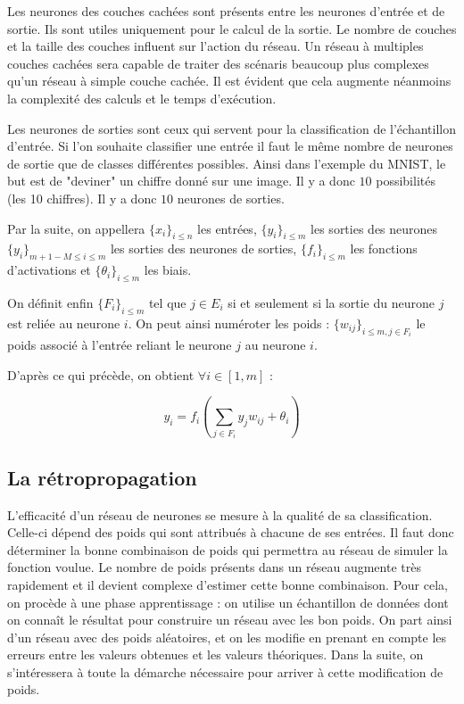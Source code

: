 \medskip

Les neurones des couches cachées sont présents entre les neurones d'entrée et
de sortie. Ils sont utiles uniquement pour le calcul de la sortie. Le nombre de
couches et la taille des couches influent sur l'action du réseau. Un réseau à
multiples couches cachées sera capable de traiter des scénaris beaucoup plus
complexes qu'un réseau à simple couche cachée. Il est évident que cela augmente
néanmoins la complexité des calculs et le temps d'exécution.

\medskip

Les neurones de sorties sont ceux qui servent pour la classification de
l'échantillon d'entrée. Si l'on souhaite classifier une entrée il faut le même
nombre de neurones de sortie que de classes différentes possibles. Ainsi dans
l'exemple du MNIST, le but est de "deviner" un chiffre donné sur une image. Il
y a donc $10$ possibilités (les 10 chiffres). Il y a donc $10$ neurones de
sorties.

\medskip

Par la suite, on appellera $\{x_i\}_{i \leq n}$ les entrées,
$\{y_i\}_{i \leq m}$ les sorties des neurones $\{y_i\}_{m+1-M \leq i \leq m}$
les sorties des neurones de sorties, $\{f_i\}_{i \leq m}$ les fonctions
d'activations et $\{\theta_i\}_{i \leq m}$ les biais.

\medskip

On définit enfin $\{F_i\}_{i \leq m}$ tel que $j \in E_i$ si et seulement si la
sortie du neurone $j$ est reliée au neurone $i$. On peut ainsi numéroter les
poids : $\{w_{ij}\}_{i \leq m, j \in F_i} $ le poids associé à l'entrée reliant
le neurone $j$ au neurone $i$.

\medskip

D'après ce qui précède, on obtient $\forall i \in [1, m]$ :

\[y_i = f_i(\sum_{j \in F_i} y_jw_{ij} + \theta_i) \]

\subsection{La rétropropagation}

L'efficacité d'un réseau de neurones se mesure à la qualité de sa classification.
Celle-ci dépend des poids qui sont attribués à chacune de ses entrées. Il faut
donc déterminer la bonne combinaison de poids qui permettra au réseau de simuler
la fonction voulue. Le nombre de poids présents dans un réseau augmente très
rapidement et il devient complexe d'estimer cette bonne combinaison. Pour cela,
on procède à une phase apprentissage : on utilise un échantillon de données
dont on connaît le résultat pour construire un réseau avec les bon poids. On
part ainsi d'un réseau avec des poids aléatoires, et on les modifie en prenant
en compte les erreurs entre les valeurs obtenues et les valeurs théoriques.
Dans la suite, on s'intéressera à toute la démarche nécessaire pour
arriver à cette modification de poids.

